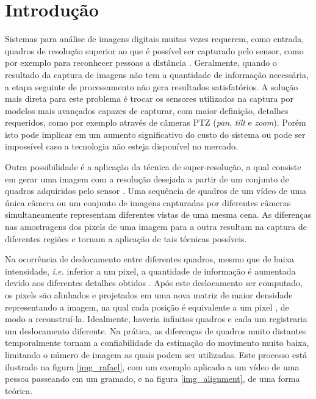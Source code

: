 \chapter{Introdução}
\label{introducao}

Sistemas para análise de imagens digitais muitas vezes requerem, como entrada,
quadros de resolução superior ao que é possível ser capturado pelo sensor, como
por exemplo para reconhecer pessoas a distância \cite{parkparkkang2003}.
Geralmente, quando o resultado da captura de imagens não tem a quantidade de
informação necessária, a etapa seguinte de processamento não gera resultados
satisfatórios. A solução mais direta para este problema é trocar os sensores
utilizados na captura por modelos mais avançados capazes de capturar, com maior
definição, detalhes requeridos, como por exemplo através de câmeras PTZ
(\textit{pan}, \textit{tilt} e \textit{zoom}). Porém isto pode implicar em um
aumento significativo do custo do sistema ou pode ser impossível caso a
tecnologia não esteja disponível no mercado.

Outra possibilidade é a aplicação da técnica de super-resolução, a qual
consiste em gerar uma imagem com a resolução desejada a partir de um conjunto
de quadros adquiridos pelo sensor \cite{howtobreak}. Uma sequência de quadros
de um vídeo de uma única câmera ou um conjunto de imagens capturadas por
diferentes câmeras simultaneamente representam diferentes vistas de uma mesma
cena. As diferenças nas amostragens dos pixels de uma imagem para a outra
resultam na captura de diferentes regiões e tornam a aplicação de tais técnicas
possíveis.

Na ocorrência de deslocamento entre diferentes quadros, mesmo que de baixa
intensidade, \textit{i.e.} inferior a um pixel, a quantidade de informação é
aumentada devido aos diferentes detalhes obtidos \cite{parkparkkang2003}. Após
este deslocamento ser computado, os pixels são alinhados e projetados em uma
nova matriz de maior densidade representando a imagem, na qual cada posição é
equivalente a um pixel \cite{gonzalez}, de modo a reconstruí-la. Idealmente,
haveria infinitos quadros e cada um registraria um deslocamento diferente. Na
prática, as diferenças de quadros muito distantes temporalmente tornam a
confiabilidade da estimação do movimento muito baixa, limitando o número de
imagem as quais podem ser utilizadas. Este processo está ilustrado na figura
\ref{img_rafael}, com um exemplo aplicado a um vídeo de uma pessoa passeando em
um gramado, e na figura \ref{img_alignment}, de uma forma teórica.

